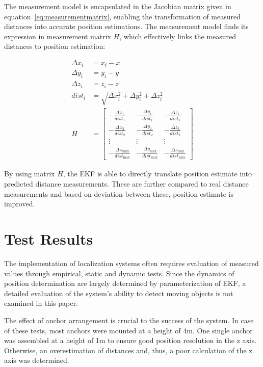 \documentclass[final, conference, a4paper]{IEEEtran}
\begin{document}
The measurement model is encapsulated in the Jacobian matrix given in equation~\ref{eq:measurementmatrix},
enabling the transformation of measured distances into accurate position estimations. 
The measurement model finds its expression in measurement matrix $H$, 
which effectively links the measured distances to position estimation:

\begin{equation}
	\begin{aligned}
		\Delta x_i &= x_i - x \\
		\Delta y_i &= y_i - y \\
		\Delta z_i &= z_i - z \\
		dist_i &= \sqrt{{\Delta x_i^2 + \Delta y_i^2 + \Delta z_i^2}} \\
		H &= \begin{bmatrix}
			-\frac{{\Delta x_1}}{{dist_1}} & -\frac{{\Delta y_1}}{{dist_1}} & -\frac{{\Delta z_1}}{{dist_1}} \\
			-\frac{{\Delta x_2}}{{dist_2}} & -\frac{{\Delta y_2}}{{dist_2}} & -\frac{{\Delta z_2}}{{dist_2}} \\
			\vdots & \vdots & \vdots \\
			-\frac{{\Delta x_{\text{max}}}}{{dist_{\text{max}}}} & -\frac{{\Delta y_{\text{max}}}}{{dist_{\text{max}}}} & -\frac{{\Delta z_{\text{max}}}}{{dist_{\text{max}}}}
		\end{bmatrix}
	\end{aligned}
	\label{eq:measurementmatrix}
\end{equation}

By using matrix $H$, the \ac{EKF} is able to directly translate position estimate into predicted distance measurements.
These are further compared to real distance measurements and based on deviation between these, position estimate is improved.


\section{Test Results}\label{section:tests}
The implementation of localization systems often requires evaluation of measured values through empirical,
static and dynamic tests.
Since the dynamics of position determination are largely determined by parameterization of \ac{EKF},
a detailed evaluation of the system's ability to detect moving objects is not examined in this paper.

The effect of anchor arrangement is crucial to the success of the system.
In case of these tests, most anchors were mounted at a height of 4m.
One single anchor was assembled at a height of 1m to ensure good position resolution in the z axis.
Otherwise, an overestimation of distances and, thus, a poor calculation of the z axis was determined.
\end{document}
